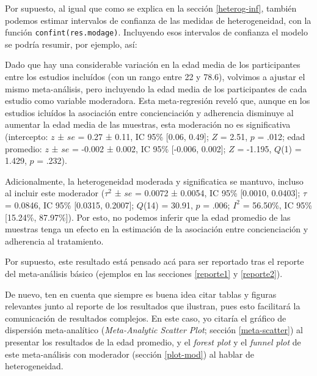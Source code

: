 \documentclass[
  bookmarksnumbered]{article}
\begin{document}
Por supuesto, al igual que como se explica en la sección \ref{heterog-inf}, también podemos estimar intervalos de confianza de las medidas de heterogeneidad, con la función \texttt{confint(res.modage)}. Incluyendo esos intervalos de confianza el modelo se podría resumir, por ejemplo, así:

\begin{tcolorbox}[enhanced,attach boxed title to top center={yshift=-3mm,yshifttext=-1mm},
  colback=iacol!5!white,colframe=iacol!75!white,colbacktitle=iacol,
  title=Ejemplo de reporte con moderador continuo,fonttitle=\bfseries, parbox=false,
  boxed title style={size=small,colframe=iacol} ]
  
Dado que hay una considerable variación en la edad media de los participantes entre los estudios incluídos (con un rango entre 22 y 78.6), volvimos a ajustar el mismo meta-análisis, pero incluyendo la edad media de los participantes de cada estudio como variable moderadora. Esta meta-regresión reveló que, aunque en los estudios icluídos la asociación entre concienciación y adherencia disminuye al aumentar la edad media de las muestras, esta moderación no es significativa (intercepto: $z$ ± $se$ = 0.27 ± 0.11, IC 95\% [0.06, 0.49]; $Z$ = 2.51, $p$ = .012; edad promedio: $z$ ± $se$ = -0.002 ± 0.002, IC 95\% [-0.006, 0.002]; $Z$ = -1.195, $Q$(1) = 1.429,   $p$ = .232). 

Adicionalmente, la heterogeneidad moderada y significatica se mantuvo, incluso al incluir este moderador ($\tau^2$ ± $se$ =  0.0072 ± 0.0054, IC 95\% [0.0010, 0.0403]; $\tau$ = 0.0846, IC 95\% [0.0315, 0.2007]; $Q$(14) =  30.91, $p$ = .006; $I^2$ = 56.50\%, IC 95\% [15.24\%, 87.97\%]). Por esto, no podemos inferir que la edad promedio de las muestras tenga un efecto en la estimación de la asociación entre concienciación y adherencia al tratamiento.  

\end{tcolorbox}

Por supuesto, este resultado está pensado acá para ser reportado tras el reporte del meta-análisis básico (ejemplos en las secciones \ref{reporte1} y \ref{reporte2}).

De nuevo, ten en cuenta que siempre es buena idea citar tablas y figuras relevantes junto al reporte de los resultados que ilustran, pues esto facilitará la comunicación de resultados complejos. En este caso, yo citaría el gráfico de dispersión meta-analítico (\emph{Meta-Analytic Scatter Plot}; sección \ref{meta-scatter}) al presentar los resultados de la edad promedio, y el \emph{forest plot} y el \emph{funnel plot} de este meta-análisis con moderador (sección \ref{plot-mod}) al hablar de heterogeneidad.
\end{document}
